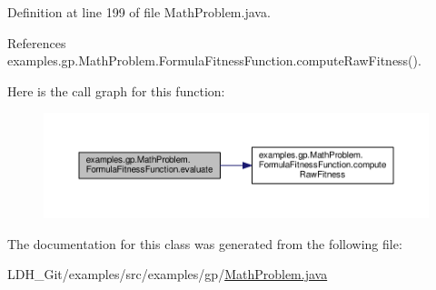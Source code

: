 Definition at line 199 of file Math\-Problem.\-java.



References examples.\-gp.\-Math\-Problem.\-Formula\-Fitness\-Function.\-compute\-Raw\-Fitness().



Here is the call graph for this function\-:
\nopagebreak
\begin{figure}[H]
\begin{center}
\leavevmode
\includegraphics[width=350pt]{classexamples_1_1gp_1_1_math_problem_1_1_formula_fitness_function_a3ee84c1e5fddebbacf41c1b3a2376fd4_cgraph}
\end{center}
\end{figure}




The documentation for this class was generated from the following file\-:\begin{DoxyCompactItemize}
\item 
L\-D\-H\-\_\-\-Git/examples/src/examples/gp/\hyperlink{_math_problem_8java}{Math\-Problem.\-java}\end{DoxyCompactItemize}
